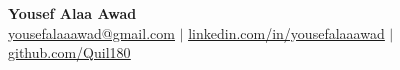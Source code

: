 \documentclass[letterpaper,10pt]{article}
\begin{document}
\begin{center}
    \textbf{\Huge Yousef Alaa Awad} \\ \vspace{1pt}
    \small \href{mailto:yousefalaaawad@gmail.com}{\underline{yousefalaaawad@gmail.com}} $|$ 
    \href{https://www.linkedin.com/in/yousefalaaawad}{\underline{linkedin.com/in/yousefalaaawad}} $|$
    \href{https://www.github.com/Quil180}{\underline{github.com/Quil180}}
\end{center}






\end{document}
